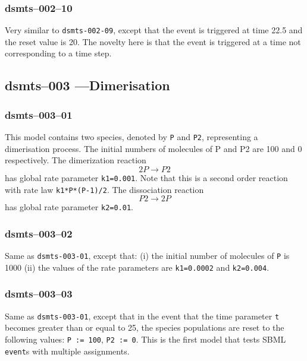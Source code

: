 
\subsubsection{dsmts--002--10}

Very similar to \verb$dsmts-002-09$, except that the event is
triggered at time 22.5 and the reset value is 20. The novelty here is
that the event is triggered at a time not corresponding to a time step.


\subsection{dsmts--003 ---Dimerisation }

\subsubsection{dsmts--003--01}

This model contains two species, denoted by \verb$P$ and \verb$P2$,
representing a dimerisation process. The initial numbers of molecules
of P and P2 are 100 and 0 respectively. The dimerization reaction 
\[
2P \longrightarrow P2
\]
has global rate parameter \verb$k1=0.001$. Note
that this is a second order reaction with rate law
\verb$k1*P*(P-1)/2$. The dissociation reaction 
\[
P2 \longrightarrow 2P
\] 
has global rate parameter \verb$k2=0.01$. 


\subsubsection{dsmts--003--02} 

Same as \verb$dsmts-003-01$, except that: (i) the initial number of
molecules of \verb$P$ is 1000 (ii) the values of the rate parameters
are \verb$k1=0.0002$ and \verb$k2=0.004$. 


\subsubsection{dsmts--003--03} 

Same as \verb$dsmts-003-01$, except that in the event that the time
parameter \verb$t$ becomes greater than or equal to 25, the species
populations are reset to the following values: \verb$P := 100$,
\verb$P2 := 0$. This is the first model that tests SBML
\verb$event$s with multiple assignments.

